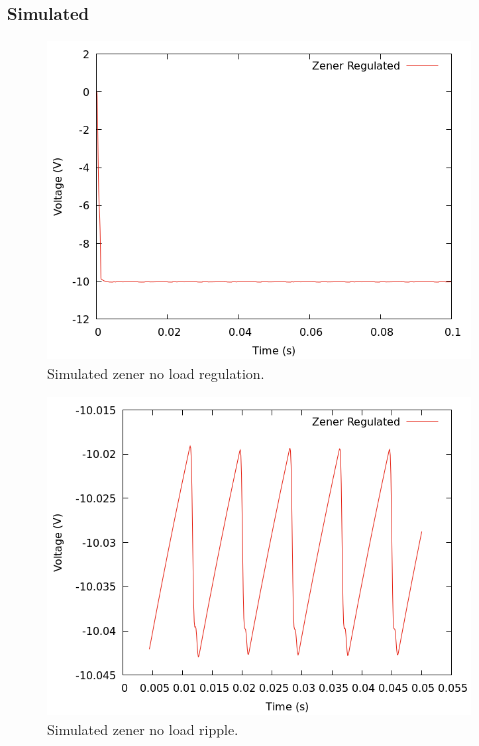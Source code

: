 \documentclass[12pt]{article}
\newcommand{\graphwidth}{0.5\linewidth}
\begin{document}
\begin{appendix}
\subsubsection{Simulated}

\begin{figure}[H]
    \centering
    \includegraphics[width=\graphwidth]{./res/image/sim-neg-regulated-noload.png}
    \caption{Simulated zener no load regulation.}
    \label{sim:neg_noload}
\end{figure}


\begin{figure}[H]
    \centering
    \includegraphics[width=\graphwidth]{./res/image/sim-neg-regulated-noload-ripple.png}
    \caption{Simulated zener no load ripple.}
    \label{sim:neg_noload_ripple}
\end{figure}


\end{appendix}
\end{document}
